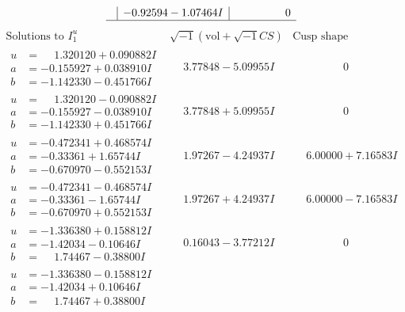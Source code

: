 \documentclass[1p]{elsarticle_modified}
\theoremstyle{definition}
\newcommand{\I}{\sqrt{-1}}
\begin{document}
$$\begin{array}{c|c|c}
 & -0.92594 - 1.07464 I & \phantom{-0.000000 } 0\\
 \hline 
 \end{array}$$\newpage$$\begin{array}{c|c|c}  
\text{Solutions to }I^u_{1}& \I (\text{vol} + \sqrt{-1}CS) & \text{Cusp shape}\\
 \hline 
\begin{aligned}
u &= \phantom{-}1.320120 + 0.090882 I \\
a &= -0.155927 + 0.038910 I \\
b &= -1.142330 - 0.451766 I\end{aligned}
 & \phantom{-}3.77848 - 5.09955 I & \phantom{-0.000000 } 0 \\ \hline\begin{aligned}
u &= \phantom{-}1.320120 - 0.090882 I \\
a &= -0.155927 - 0.038910 I \\
b &= -1.142330 + 0.451766 I\end{aligned}
 & \phantom{-}3.77848 + 5.09955 I & \phantom{-0.000000 } 0 \\ \hline\begin{aligned}
u &= -0.472341 + 0.468574 I \\
a &= -0.33361 + 1.65744 I \\
b &= -0.670970 - 0.552153 I\end{aligned}
 & \phantom{-}1.97267 - 4.24937 I & \phantom{-}6.00000 + 7.16583 I \\ \hline\begin{aligned}
u &= -0.472341 - 0.468574 I \\
a &= -0.33361 - 1.65744 I \\
b &= -0.670970 + 0.552153 I\end{aligned}
 & \phantom{-}1.97267 + 4.24937 I & \phantom{-}6.00000 - 7.16583 I \\ \hline\begin{aligned}
u &= -1.336380 + 0.158812 I \\
a &= -1.42034 - 0.10646 I \\
b &= \phantom{-}1.74467 - 0.38800 I\end{aligned}
 & \phantom{-}0.16043 - 3.77212 I & \phantom{-0.000000 } 0 \\ \hline\begin{aligned}
u &= -1.336380 - 0.158812 I \\
a &= -1.42034 + 0.10646 I \\
b &= \phantom{-}1.74467 + 0.38800 I\end{aligned}

\end{array}$$
\end{document}
